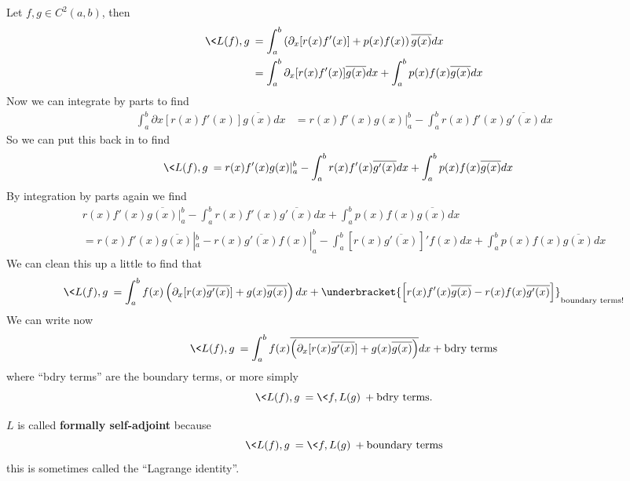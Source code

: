 Let $f,g\in C^{2}(a,b)$, then
\begin{subequations}
\begin{align}
\<L(f),g\> &= \int^{b}_{a}\left(\partial_{x}[r(x)f'(x)]+p(x)f(x)\right)\overline{g(x)}dx\\
&=\int^{b}_{a}\partial_{x}[r(x)f'(x)]\overline{g(x)}dx + \int^{b}_{a}p(x)f(x)\overline{g(x)}dx
\end{align}
\end{subequations}
Now we can integrate by parts to find
\begin{align}
\int^{b}_{a}\partial{x}[r(x)f'(x)]\overline{g(x)}dx&=r(x)f'(x)g(x)|^{b}_{a}
- \int^{b}_{a}r(x)f'(x)\overline{g'(x)}dx
\end{align}
So we can put this back in to find
\begin{align}
\<L(f),g\> &= r(x)f'(x)g(x)|^{b}_{a}-\int^{b}_{a}r(x)f'(x)\overline{g'(x)}dx+\int^{b}_{a}p(x)f(x)\overline{g(x)}dx
\end{align}
By integration by parts again we find
\begin{multline}
 r(x)f'(x)\overline{g(x)}|^{b}_{a}-\int^{b}_{a}r(x)f'(x)\overline{g'(x)}dx+\int^{b}_{a}p(x)f(x)\overline{g(x)}dx\\
=r(x)f'(x)\overline{g(x)}|^{b}_{a}-r(x)\overline{g'(x)}f(x)|^{b}_{a}-\int^{b}_{a}[r(x)\overline{g'(x)}]'f(x)dx+\int^{b}_{a}p(x)f(x)\overline{g(x)}dx
\end{multline}
We can clean this up a little to find that
\begin{equation}
\<L(f),g\> =
\int^{b}_{a}f(x)\left(\partial_{x}[r(x)\overline{g'(x)}]+g(x)\overline{g(x)}\right)dx+\underbracket{\left[r(x)f'(x)\overline{g(x)}-r(x)f(x)\overline{g'(x)}\right]}_{\text{boundary terms!}}
\end{equation}
We can write now
\begin{equation}
\<L(f),g\> =
\int^{b}_{a}f(x)\overline{\left(\partial_{x}[r(x)\overline{g'(x)}]+g(x)\overline{g(x)}\right)}dx+\text{bdry terms}
\end{equation}
where ``bdry terms'' are the boundary terms, or more simply
\begin{equation}
\<L(f),g\>=\<f,L(g)\>+\text{bdry terms}.
\end{equation}

\begin{defn}
$L$ is called \textbf{formally self-adjoint} because 
\begin{equation}
\<L(f),g\>=\<f,L(g)\>+\text{boundary terms}
\end{equation}
this is sometimes called the ``Lagrange identity''.
\end{defn}

